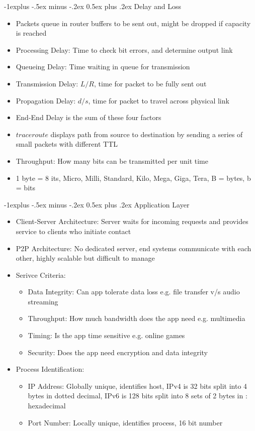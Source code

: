 \documentclass[10pt, landscape]{article}
\makeatletter
\renewcommand{\section}{\@startsection{section}{1}{0mm}%
                                {-1ex plus -.5ex minus -.2ex}%
                                {0.5ex plus .2ex}%
                                {\normalfont\large\bfseries}}
\renewcommand{\section}{\@startsection{section}{2}{0mm}%
                                {-1explus -.5ex minus -.2ex}%
                                {0.5ex plus .2ex}%
                                {\normalfont\normalsize\bfseries}}
\makeatother
\begin{document}
\begin{multicols*}{3}
\section{Delay and Loss}
\begin{itemize}
    \item Packets queue in router buffers to be sent out, might be dropped if capacity is reached
    \item Processing Delay: Time to check bit errors, and determine output link
    \item Queueing Delay: Time waiting in queue for transmission
    \item Transmission Delay: $L/R$, time for packet to be fully sent out
    \item Propagation Delay: $d/s$, time for packet to travel across physical link
    \item End-End Delay is the sum of these four factors
    \item $traceroute$ displays path from source to destination by sending a series of small packets with different TTL
    \item Throughput: How many bits can be transmitted per unit time
    \item 1 byte = 8 its, Micro, Milli, Standard, Kilo, Mega, Giga, Tera, B = bytes, b = bits
\end{itemize}

\section{Application Layer}
\begin{itemize}
    \item Client-Server Architecture: Server waits for incoming requests and provides service to clients who initiate contact
    \item P2P Architecture: No dedicated server, end systems communicate with each other, highly scalable but difficult to manage
    \item Serivce Criteria:
    \begin{itemize}
        \item Data Integrity: Can app tolerate data loss e.g. file transfer v/s audio streaming
        \item Throughput: How much bandwidth does the app need e.g. multimedia
        \item Timing: Is the app time sensitive e.g. online games
        \item Security: Does the app need encryption and data integrity
    \end{itemize}
    \item Process Identification:
    \begin{itemize}
        \item IP Address: Globally unique, identifies host, IPv4 is 32 bits split into 4 bytes in dotted decimal, IPv6 is 128 bits split into 8 sets of 2 bytes in : hexadecimal
        \item Port Number: Locally unique, identifies process, 16 bit number
    \end{itemize}
\end{itemize}


\end{multicols*}
\end{document}
